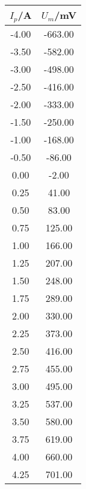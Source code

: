 \begin{norma}\begin{tabular}{|c|c|}
\hline
\textbf{$I_p$/A}&\textbf{$U_m$/mV}\\\hline
-4.00&-663.00\\\hline
-3.50&-582.00\\\hline
-3.00&-498.00\\\hline
-2.50&-416.00\\\hline
-2.00&-333.00\\\hline
-1.50&-250.00\\\hline
-1.00&-168.00\\\hline
-0.50&-86.00\\\hline
0.00&-2.00\\\hline
0.25&41.00\\\hline
0.50&83.00\\\hline
0.75&125.00\\\hline
1.00&166.00\\\hline
1.25&207.00\\\hline
1.50&248.00\\\hline
1.75&289.00\\\hline
2.00&330.00\\\hline
2.25&373.00\\\hline
2.50&416.00\\\hline
2.75&455.00\\\hline
3.00&495.00\\\hline
3.25&537.00\\\hline
3.50&580.00\\\hline
3.75&619.00\\\hline
4.00&660.00\\\hline
4.25&701.00\\\hline
\end{tabular}
\end{norma}